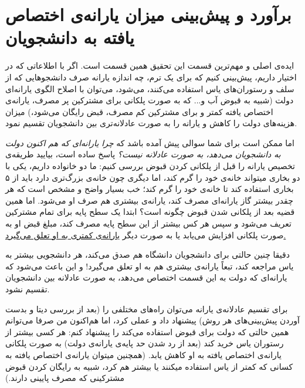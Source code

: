 \documentclass{article}
\begin{document}
	\section{برآورد و پیش‌بینی میزان یارانه‌ی اختصاص یافته‌ به دانشجویان}
		ایده‌ی اصلی و مهم‌ترین قسمت‌ این تحقیق همین قسمت است. اگر با اطلاعاتی که در اختیار داریم، پیش‌بینی کنیم که برای یک ترم، چه اندازه یارانه‌ صرف دانشجو‌هایی که از سلف و رستوران‌های یاس استفاده می‌کنند، می‌شود، می‌توان با اصلاح الگوی یارانه‌ای دولت (شبیه به قبوض آب و... که به صورت پلکانی برای مشترکین پر مصرف، یارانه‌ی اختصاص یافته کمتر و برای مشترکین کم مصرف، قبض رایگان می‌شود،) میزان‌ هزینه‌‌های دولت را کاهش و یارانه را به صورت عادلانه‌تری بین دانشجویان تقسیم نمود.
		
		
		اما ممکن است برای شما سوالی پیش  آمده باشد که \textit{چرا یارانه‌ای که هم اکنون دولت به دانشجویان می‌دهد، به صورت عادلانه نیست؟}
		پاسخ ساده‌ است، بیایید طریقه‌ی تخصیص یارانه را قبل از پلکانی کردن قبوض بررسی کنیم: ما دو خانواده داریم، یکی با دو بخاری میتواند خانه‌ی خود را گرم کند، اما دیگری چون خانه‌ی بزرگ‌تری دارد باید از ۵ بخاری استفاده کند تا خانه‌ی خود را گرم کند؛ خب بسیار واضح و مشخص است که هر چقدر بیشتر گاز یارانه‌ای مصرف کند، یارانه‌ی بیشتری هم صرف او می‌شود. اما همین قضیه بعد از پلکانی شدن قبوض چگونه است؟ ابتدا یک سطح پایه‌ برای تمام مشترکین تعریف می‌شود و سپس هر کس بیشتر از این سطح پایه مصرف کند، مبلغ قبض او به صورت پلکانی افزایش می‌یابد یا به صورت دیگر \underline{یارانه‌ی کمتری به او تعلق می‌گیرد.} 
		
		دقیقا چنین حالتی برای دانشجویان دانشگاه هم صدق می‌کند، هر دانشجویی بیشتر به یاس مراجعه کند، تبعاً یارانه‌ی بیشتری هم به او تعلق می‌گیرد! و این باعث می‌شود که یارانه‌ای که دولت به این قسمت اختصاص می‌دهد، به صورت عادلانه بین دانشجویان تقسیم نشود. 
		
		برای تقسیم عادلانه‌ی یارانه‌ می‌توان راه‌های مختلفی را (بعد از بررسی دیتا و بدست‌ آوردن پیش‌بینی‌های هر روش) پیشنهاد داد و عملی کرد، اما هم‌اکنون من صرفا می‌توانم همین حالتی که دولت برای قبوض استفاده می‌کند را پیشنهاد کنم:‌ هر کسی بیشتر از رستوران یاس خرید کند (بعد از رد شدن حد پایه‌ی یارانه‌ی دولت) به صورت پلکانی یارانه‌ی اختصاص یافته به او کاهش یابد. (همچنین میتوان یارانه‌ی اختصاص یافته‌ به کسانی که کمتر از یاس استفاده میکنند یا بیشتر هم کرد، شبیه به رایگان کردن قبوض مشترکینی که مصرف پایینی دارند.)
		
\end{document}
